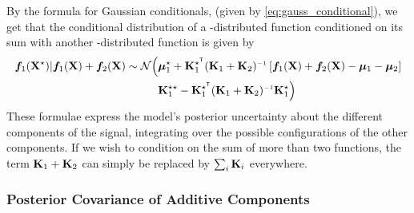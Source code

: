 By the formula for Gaussian conditionals, (given by \cref{eq:gauss_conditional}), we get that the conditional distribution of a \gp{}-distributed function conditioned on its sum with another \gp{}-distributed function is given by
%
\begin{align}
\vf_1(\vX^\star) | \vf_1(\vX) + \vf_2(\vX) \sim \Normal \Big( 
& \vmu_1^\star + \vK_1^{\star\tra} (\vK_1 + \vK_2)\inv \left[ \vf_1(\vX) + \vf_2(\vX) - \vmu_1 - \vmu_2 \right] \nonumber \\
& \vK_1^{\star\star} - \vK_1^{\star\tra} (\vK_1 + \vK_2)\inv \vK_1^{\star} \Big)
\end{align}
%
These formulae express the model's posterior uncertainty about the different components of the signal, integrating over the possible configurations of the other components.
If we wish to condition on the sum of more than two functions, the term $\mathbf{K}_1 + \mathbf{K}_2$ can simply be replaced by $\sum_i \mathbf{K}_i$ everywhere.




\subsubsection{Posterior Covariance of Additive Components}

